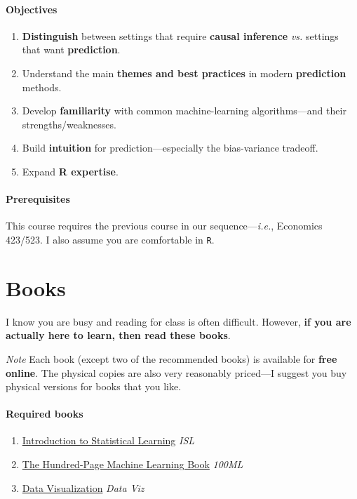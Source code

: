 \documentclass[10pt]{article}
\newcommand{\emf}[1]{\textbf{\textcolor{grass_green}{#1}}}
\begin{document}
\paragraph{Objectives}

\begin{enumerate}
  \item \emf{Distinguish} between settings that require \emf{causal inference} \textit{vs.} settings that want \emf{prediction}.
  \item Understand the main \emf{themes and best practices} in modern \emf{prediction} methods.
  \item Develop \emf{familiarity} with common machine-learning algorithms---and their strengths/weaknesses.
  \item Build \emf{intuition} for prediction---especially the bias-variance tradeoff.
  \item Expand \emf{R expertise}.
\end{enumerate}

\paragraph{Prerequisites} This course requires the previous course in our sequence---\textit{i.e.}, Economics 423/523. I also assume you are comfortable in \texttt{R}.

\section*{Books} I know you are busy and reading for class is often difficult. However, \emf{if you are actually here to learn, then read these books}.

\bigskip

\noindent\textit{Note} Each book (except two of the recommended books) is available for \emf{free online}. The physical copies are also very reasonably priced---I suggest you buy physical versions for books that you like.

\paragraph{Required books}

\begin{enumerate}
\item \href{https://www.statlearning.com/}{Introduction to Statistical Learning} \textit{ISL}
\item \href{http://themlbook.com/}{The Hundred-Page Machine Learning Book} \textit{100ML}
\item \href{https://socviz.co/}{Data Visualization} \textit{Data Viz}
\end{enumerate}
\end{document}
